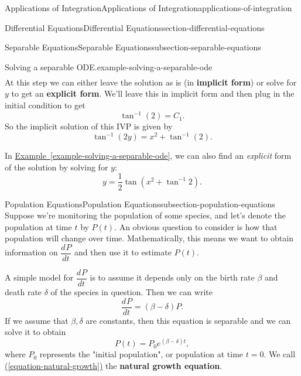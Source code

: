 \documentclass[oneside,10pt,]{book}
\newcommand{\terminology}[1]{\textbf{#1}}
\numberwithin{equation}{section}
\newcommand{\dv}[3][]{\dfrac{d^{#1} #2}{d #3^{#1}}}
\begin{document}
\begin{chapterptx}{Applications of Integration}{}{Applications of Integration}{}{}{applications-of-integration}
\begin{sectionptx}{Differential Equations}{}{Differential Equations}{}{}{section-differential-equations}
\begin{subsectionptx}{Separable Equations}{}{Separable Equations}{}{}{subsection-separable-equations}
\begin{example}{Solving a separable ODE.}{example-solving-a-separable-ode}
\begin{align*}
\end{align*}
\hypertarget{p-734}{}%
At this step we can either leave the solution as is (in \terminology{implicit form}) or solve for \(y\) to get an \terminology{explicit form}. We'll leave this in implicit form and then plug in the initial condition to get%
\begin{equation*}
\tan^{-1}(2) = C_{1}.
\end{equation*}
So the implicit solution of this IVP is given by%
\begin{equation*}
\tan^{-1}(2y) = x^{2}+\tan^{-1}(2).
\end{equation*}
%
\end{example}
\hypertarget{p-735}{}%
In \hyperref[example-solving-a-separable-ode]{Example~\ref{example-solving-a-separable-ode}}, we can also find an \emph{explicit} form of the solution by solving for \(y\):%
\begin{equation*}
y = \frac{1}{2}\tan(x^{2} + \tan^{-1}2).
\end{equation*}
%
\end{subsectionptx}
%
%
\typeout{************************************************}
\typeout{************************************************}
%
\begin{subsectionptx}{Population Equations}{}{Population Equations}{}{}{subsection-population-equations}
\hypertarget{p-736}{}%
Suppose we're monitoring the population of some species, and let's denote the population at time \(t\) by \(P(t)\). An obvious question to consider is how that population will change over time. Mathematically, this means we want to obtain information on \(\dv{P}{t}\) and then use it to estimate \(P(t)\).%
\par
\hypertarget{p-737}{}%
A simple model for \(\dv{P}{t}\) is to assume it depends only on the birth rate \(\beta\) and death rate \(\delta\) of the species in question. Then we can write%
\begin{equation}
\dv{P}{t} = (\beta - \delta)P.\label{equation-natural-growth}
\end{equation}
If we assume that \(\beta,\delta\) are constants, then this equation is separable and we can solve it to obtain%
\begin{equation*}
P(t) = P_{0}e^{(\beta - \delta)t},
\end{equation*}
where \(P_{0}\) represents the "initial population", or population at time \(t = 0\). We call \hyperref[equation-natural-growth]{(\ref{equation-natural-growth})} the \terminology{natural growth equation}.%

\end{subsectionptx}
\end{sectionptx}
\end{chapterptx}
\end{document}

